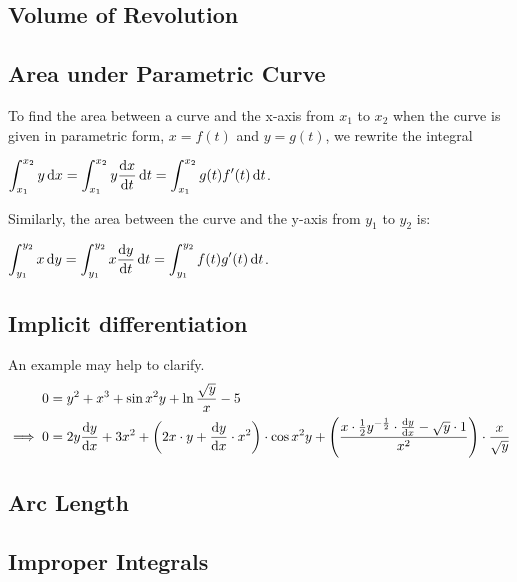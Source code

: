 \documentclass[a4paper,11pt]{article}
\begin{document}
    \subsection{Volume of Revolution}

    \subsection{Area under Parametric Curve} \label{sec:calc_parametric_area}

    To find the area between a curve and the x-axis from $x_1$ to $x_2$ when the
    curve is given in parametric form, $x = f(t)$ and $y = g(t)$, we rewrite the
    integral

    $\displaystyle \int_{x_1}^{x_2} y \dd{x} =
     \int_{x_1}^{x_2} y \dv{x}{t} \dd{t} = \int_{x_1}^{x_2} g(t)f'(t) \dd{t}$.

    Similarly, the area between the curve and the y-axis from $y_1$ to $y_2$ is:

    $\displaystyle \int_{y_1}^{y_2} x \dd{y} =
     \int_{y_1}^{y_2} x \dv{y}{t} \dd{t} = \int_{y_1}^{y_2} f(t)g'(t) \dd{t}$.

    \subsection{Implicit differentiation}



    An example may help to clarify.
    \begin{align*}
    0 &= y^2 + x^3 + \sin x^2 y + \ln \frac{\sqrt y} x - 5 \\
    \implies 0 &=
                2y \dv{y}{x} + 3x^2 +
                \pqty{2x \cdot y + \dv{y}{x} \cdot x^2} \cdot \cos x^2 y +
                \pqty{\frac{x \cdot \frac 12 y^{-\frac 12} \cdot \dv{y}{x} -
                            \sqrt y \cdot 1}
                           {x^2}} \cdot \frac{x}{\sqrt y} \\
    \end{align*}


    \subsection{Arc Length}

    \subsection{Improper Integrals}
\end{document}
